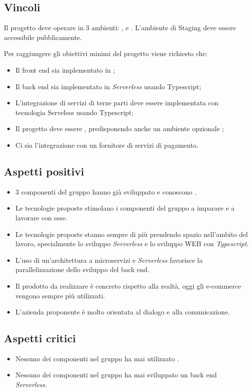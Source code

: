 \subsection{Vincoli}
Il progetto deve operare in 3 ambienti: ,  e . L'ambiente di Staging deve essere accessibile pubblicamente.

Per raggiungere gli obiettivi minimi del progetto viene richiesto che:
\begin{itemize}
	\item Il front end sia implementato in \textit{};
	\item Il back end sia implementato in \textit{Serverless} usando Typescript;
	\item L'integrazione di servizi di terze parti deve essere implementata con tecnologia Serveless usando Typescript;
	\item Il progetto deve essere , predisponendo anche un ambiente opzionale ;
	\item Ci sia l'integrazione con un fornitore di servizi di pagamento.
\end{itemize}

\subsection{Aspetti positivi}
\begin{itemize}
	\item 3 componenti del gruppo hanno già sviluppato e conoscono \textit{}.
	\item Le tecnologie proposte stimolano i componenti del gruppo a imparare e a lavorare con esse.
	\item Le tecnologie proposte stanno sempre di più prendendo spazio nell'ambito del lavoro, specialmente lo sviluppo \textit{Serverless} e lo sviluppo WEB con \textit{Typescript}.
	\item L'uso di un'architettura a microservizi e \textit{Serverless} favorisce la parallelizzazione dello sviluppo del back end.
	\item Il prodotto da realizzare è concreto rispetto alla realtà, oggi gli e-commerce vengono sempre più utilizzati.
	\item L'azienda proponente è molto orientata al dialogo e alla comunicazione.
\end{itemize}

\subsection{Aspetti critici}
\begin{itemize}
	\item Nessuno dei componenti nel gruppo ha mai utilizzato \textit{}.
	\item Nessuno dei componenti nel gruppo ha mai sviluppato un back end \textit{Serverless}.
\end{itemize}

